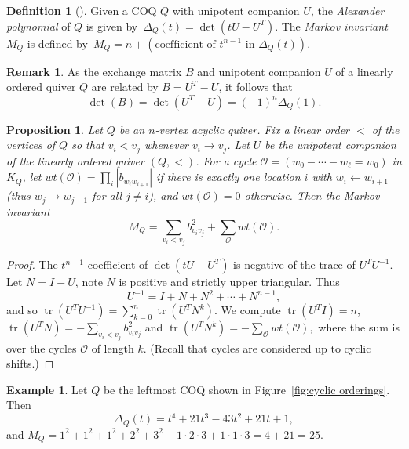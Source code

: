 \documentclass[11pt, letterpaper]{amsart}
\newcommand{\cS}[1]{{\noindent\textsf{\color{purple}$\blacksquare$~#1~$\blacksquare$}}}
\newtheorem{proposition}[theorem]{Proposition}
\theoremstyle{definition}
\newtheorem{remark}[theorem]{Remark}
\newtheorem{example}[theorem]{Example}
\newtheorem{definition}[theorem]{Definition}
\numberwithin{equation}{section}
\def\tr{{\operatorname{tr}}}
\begin{document}
\begin{definition}[{\cite[Definition 8.1]{COQ}}]
\label{def:alexander and markov}
Given a COQ $Q$ with unipotent companion $U$, the \emph{Alexander polynomial} of $Q$ is given by~$\Delta_Q(t) = \det(tU - U^T)$.
The \emph{Markov invariant} $M_Q$ is defined by~$M_Q = n + (\text{coefficient of } t^{n-1} \text{ in } \Delta_Q(t))$.
\end{definition}

\begin{remark}
As the exchange matrix $B$ and unipotent companion $U$ of a linearly ordered quiver $Q$ are related by $B = U^T - U$, it follows that $$\det(B) = \det(U^T - U) = (-1)^n \Delta_Q(1).$$
\end{remark}

\begin{proposition}
\label{prop:markov positive}
Let $Q$ be an $n$-vertex acyclic quiver.
Fix a linear order $<$ of the vertices of $Q$ so that $ v_i < v_j$ whenever $v_i \rightarrow v_j$.
Let $U$ be the unipotent companion of the linearly ordered quiver $(Q, <)$.
For a cycle $\mathcal O = (w_0 - \cdots - w_\ell = w_0)$ in $K_Q$, let $wt(\mathcal O) = \prod_i |b_{w_i w_{i+1}}|$ if there is exactly one location $i$ with $w_{i} \leftarrow w_{i+1}$ (thus $w_j \rightarrow w_{j+1}$ for all $j\neq i$), and $wt(\mathcal O) = 0$ otherwise.
Then the Markov invariant 
$$M_Q = \sum_{v_i < v_j} b_{v_i v_j}^2 + \sum_{\mathcal O} wt(\mathcal O).$$
\end{proposition}

\begin{proof}
The $t^{n-1}$ coefficient of $\det(tU - U^T)$ is negative of the trace of $U^{T} U^{-1}$. 
Let $N = I-U$, note $N$ is positive and strictly upper triangular. 
Thus $$U^{-1} = I + N + N^2 + \cdots + N^{n-1},$$ and so $\tr(U^{T}\! U^{-1}) = \sum_{k=0}^n \tr(U^T\! N^k)$.
We compute $\tr(U^T\! I)\! = n$, $\tr(U^T\! N)\! =-\sum_{v_i < v_j}\! b_{v_i v_j}^2$ and $\tr(U^T\! N^k) = -\sum_{\mathcal O} wt(\mathcal O),$ where the sum is over the cycles $\mathcal O$ of length $k$. %
(Recall that cycles are considered up to cyclic shifts.)
\end{proof}

\begin{example}
\label{eg:Markov}
Let $Q$ be the leftmost COQ shown in Figure~\ref{fig:cyclic orderings}.
Then $$\Delta_Q(t)= t^{4} + 21 t^{3} - 43 t^{2} + 21 t + 1,$$ and $M_Q = 1^2 + 1^2 + 1^2 + 2^2 + 3^2 + 1 \cdot 2 \cdot 3 + 1 \cdot 1 \cdot 3 = 4 + 21 = 25.$
\end{example}
\end{document}
